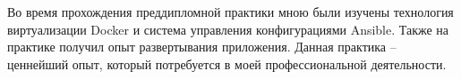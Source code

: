Во время прохождения преддипломной практики мною были изучены технология
виртуализации Docker и система управления конфигурациями Ansible. Также на
практике получил опыт развертывания приложения. Данная практика -- ценнейший
опыт, который потребуется в моей профессиональной деятельности.
